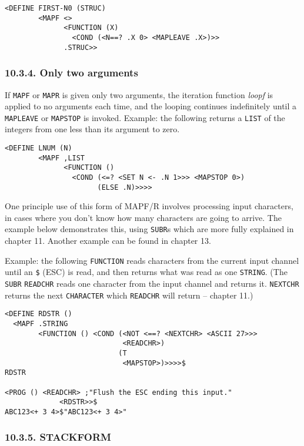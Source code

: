 \documentclass[a4paper,]{article}
\begin{document}
\begin{verbatim}
<DEFINE FIRST-N0 (STRUC)
        <MAPF <>
              <FUNCTION (X)
                <COND (<N==? .X 0> <MAPLEAVE .X>)>>
              .STRUC>>
\end{verbatim}

\subsubsection{10.3.4. Only two arguments}\label{only-two-arguments}

If \texttt{MAPF} or \texttt{MAPR} is given only two arguments, the iteration function \emph{loopf} is applied to no
arguments each time, and the looping continues indefinitely until a \texttt{MAPLEAVE} or \texttt{MAPSTOP} is invoked.
Example: the following returns a \texttt{LIST} of the integers from one less than its argument to zero.

\begin{verbatim}
<DEFINE LNUM (N)
        <MAPF ,LIST
              <FUNCTION ()
                <COND (<=? <SET N <- .N 1>>> <MAPSTOP 0>)
                      (ELSE .N)>>>>
\end{verbatim}

One principle use of this form of MAPF/R involves processing input characters, in cases where you don't know how many
characters are going to arrive. The example below demonstrates this, using \texttt{SUBR}s which are more fully explained in
chapter 11. Another example can be found in chapter 13.

Example: the following \texttt{FUNCTION} reads characters from the current input channel until an \texttt{\$} (ESC) is
read, and then returns what was read as one \texttt{STRING}. (The \texttt{SUBR} \texttt{READCHR} 
reads one character from the input channel and returns it. \texttt{NEXTCHR}  returns the next
\texttt{CHARACTER} which \texttt{READCHR} will return -- chapter 11.)

\begin{verbatim}
<DEFINE RDSTR ()
  <MAPF .STRING
        <FUNCTION () <COND (<NOT <==? <NEXTCHR> <ASCII 27>>>
                            <READCHR>)
                           (T
                            <MAPSTOP>)>>>>$
RDSTR

<PROG () <READCHR> ;"Flush the ESC ending this input."
             <RDSTR>>$
ABC123<+ 3 4>$"ABC123<+ 3 4>"
\end{verbatim}

\subsubsection{10.3.5. STACKFORM}\label{stackform}
\end{document}
